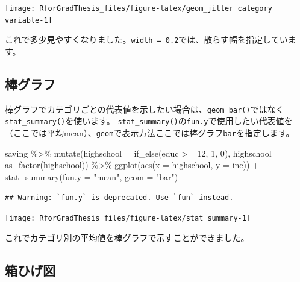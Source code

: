 \documentclass[
]{book}
\newenvironment{Shaded}{\begin{snugshade}}{\end{snugshade}}
\newcommand{\AttributeTok}[1]{\textcolor[rgb]{0.77,0.63,0.00}{#1}}
\newcommand{\DecValTok}[1]{\textcolor[rgb]{0.00,0.00,0.81}{#1}}
\newcommand{\FunctionTok}[1]{\textcolor[rgb]{0.00,0.00,0.00}{#1}}
\newcommand{\NormalTok}[1]{#1}
\newcommand{\SpecialCharTok}[1]{\textcolor[rgb]{0.00,0.00,0.00}{#1}}
\newcommand{\StringTok}[1]{\textcolor[rgb]{0.31,0.60,0.02}{#1}}
\begin{document}
\begin{center}\texttt{[image: RforGradThesis\_files/figure-latex/geom\_jitter category variable-1]} \end{center}

これで多少見やすくなりました。\texttt{width\ =\ 0.2}では、散らす幅を指定しています。

\hypertarget{ux68d2ux30b0ux30e9ux30d5-1}{%
\subsection{棒グラフ}\label{ux68d2ux30b0ux30e9ux30d5-1}}

棒グラフでカテゴリごとの代表値を示したい場合は、\texttt{geom\_bar()}ではなく\texttt{stat\_summary()}を使います。
\texttt{stat\_summary()}の\texttt{fun.y}で使用したい代表値を（ここでは平均mean）、\texttt{geom}で表示方法ここでは棒グラフ\texttt{bar}を指定します。

\begin{Shaded}
\begin{Highlighting}[]
\NormalTok{saving }\SpecialCharTok{\%\textgreater{}\%}
  \FunctionTok{mutate}\NormalTok{(}\AttributeTok{highschool =} \FunctionTok{if\_else}\NormalTok{(educ }\SpecialCharTok{\textgreater{}=} \DecValTok{12}\NormalTok{, }\DecValTok{1}\NormalTok{, }\DecValTok{0}\NormalTok{),}
         \AttributeTok{highschool =} \FunctionTok{as\_factor}\NormalTok{(highschool)) }\SpecialCharTok{\%\textgreater{}\%}
  \FunctionTok{ggplot}\NormalTok{(}\FunctionTok{aes}\NormalTok{(}\AttributeTok{x =}\NormalTok{ highschool, }\AttributeTok{y =}\NormalTok{ inc)) }\SpecialCharTok{+}
  \FunctionTok{stat\_summary}\NormalTok{(}\AttributeTok{fun.y =} \StringTok{"mean"}\NormalTok{, }\AttributeTok{geom =} \StringTok{"bar"}\NormalTok{)}
\end{Highlighting}
\end{Shaded}

\begin{verbatim}
## Warning: `fun.y` is deprecated. Use `fun` instead.
\end{verbatim}

\begin{center}\texttt{[image: RforGradThesis\_files/figure-latex/stat\_summary-1]} \end{center}

これでカテゴリ別の平均値を棒グラフで示すことができました。

\hypertarget{ux7bb1ux3072ux3052ux56f3}{%
\subsection{箱ひげ図}\label{ux7bb1ux3072ux3052ux56f3}}
\end{document}
